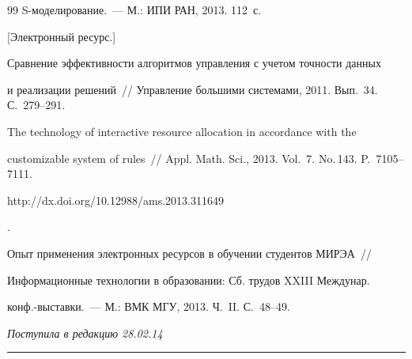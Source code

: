 {{\begin{thebibliography}{99}
S-мо\-де\-ли\-ро\-ва\-ние.~--- М.: ИПИ РАН, 2013. 112~с.


[Электронный ресурс.] %






 Сравнение эффективности алгоритмов управления с учетом точности данных


и реализации решений~/\!\!/ Управление большими системами, 2011. Вып.~34. С.~279--291.




 The technology of interactive resource allocation in accordance with the


customizable system of rules~/\!\!/ Appl. Math. Sci., 2013. Vol.~7. No.\,143. P.~7105--7111. {\sf


http://dx.doi.org/10.12988/ams.2013.311649}.




 Опыт применения электронных ресурсов в обучении студентов МИРЭА~/\!\!/


Информационные технологии в образовании: Сб. трудов XXIII Междунар.


конф.-вы\-став\-ки.~--- М.: ВМК МГУ, 2013.  Ч.~II. С.~48--49.





\end{thebibliography}


}


}





\vspace*{-6pt}





\hfill{\small\textit{Поступила в редакцию 28.02.14}}








\vspace*{12pt}





\hrule





\vspace*{2pt}





